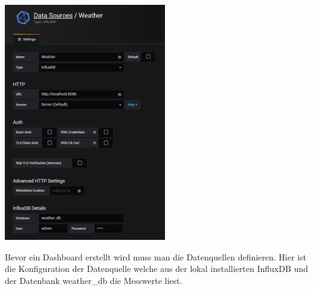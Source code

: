 \documentclass[
  12pt, %
  a4paper, %
  twoside, %
  openany, %
  numbers=noenddot, %
  BCOR=5mm, %
  parskip=half*, %
  thesis, %
]{bfhbook}
\begin{document}
\begin{center}
    \begin{minipage}[t]{0.45\textwidth}
        \centering
        \includegraphics[width=7cm]{Bilder/Grafana-Datasource.PNG} %
        \captionsetup{justification=centering}
    \end{minipage}
    \begin{minipage}[t]{0.45\textwidth}
Bevor ein Dashboard erstellt wird muss man die Datenquellen definieren. Hier ist die Konfiguration der Datenquelle welche aus der lokal installierten InfluxDB und der Datenbank weather{\_}db die Messwerte liest.
    \end{minipage}
\end{center}
\end{document}
